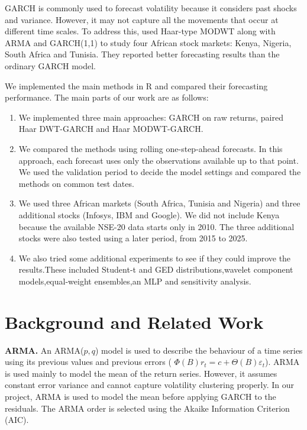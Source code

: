 \documentclass{article}
\begin{document}
GARCH is commonly used to forecast volatility because it considers past shocks and variance. However, it may not capture all the movements that occur at different time scales. To address this, \citet{ismail2016} used Haar-type MODWT along with ARMA and GARCH(1,1) to study four African stock markets: Kenya, Nigeria, South Africa and Tunisia. They reported better forecasting results than the ordinary GARCH model.

We implemented the main methods in R and compared their forecasting performance. The main parts of our work are as follows:

\begin{enumerate}
    \item We implemented three main approaches: GARCH on raw returns, paired Haar DWT-GARCH and Haar MODWT-GARCH.

    \item We compared the methods using rolling one-step-ahead forecasts. In this approach, each forecast uses only the observations available up to that point. We used the validation period to decide the model settings and compared the methods on common test dates.

    \item We used three African markets (South Africa, Tunisia and Nigeria) and three additional stocks (Infosys, IBM and Google). We did not include Kenya because the available NSE-20 data starts only in 2010. The three additional stocks were also tested using a later period, from 2015 to 2025.

    \item We also tried some additional experiments to see if they could improve the results.These included Student-t and GED distributions,wavelet component models,equal-weight ensembles,an MLP and sensitivity analysis.
\end{enumerate}

\section{Background and Related Work}
\label{sec:background}

\textbf{ARMA.} An ARMA($p,q$) model is used to describe the behaviour of a time series using its previous values and previous errors (
$\Phi(B)r_t=c+\Theta(B)\varepsilon_t$). ARMA is used mainly to model the mean of the return series. However, it assumes constant error variance and cannot capture volatility clustering properly. In our project, ARMA is used to model the mean before applying GARCH to the residuals. The ARMA order is selected using the Akaike Information Criterion (AIC).
\end{document}
